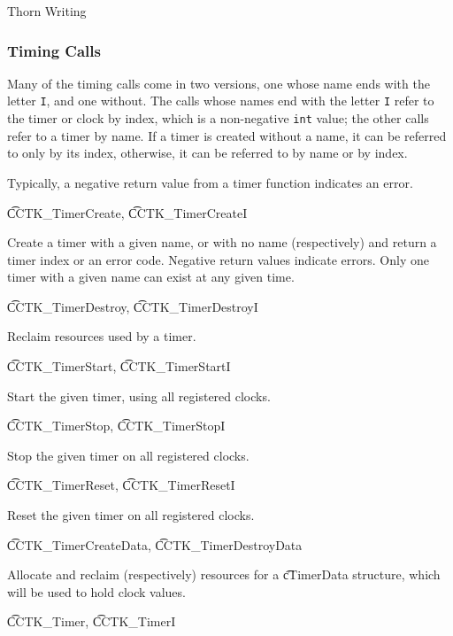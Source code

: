 \begin{cactuspart}{Thorn Writing}
\subsubsection{Timing Calls}

Many of the timing calls come in two versions, one whose name ends with 
the letter \texttt{I}, and one without.  The calls whose names end with the 
letter \texttt{I} refer to the timer or clock by index, which is a
non-negative \texttt{int} value; the other calls refer to a timer by name. 
If a timer is created without a name, it can be referred to only by its index,
otherwise, it can be referred to by name or by index.

Typically, a negative return value from a timer function indicates an error.

\begin{Lentry}

\item[{\t CCTK\_TimerCreate}, {\t CCTK\_TimerCreateI}]

Create a timer with a given name, or with no name (respectively)
and return a timer index or an error code.
Negative return values indicate errors. 
Only one timer with a given name can exist at any given time.

\item[{\t CCTK\_TimerDestroy}, {\t CCTK\_TimerDestroyI}]

Reclaim resources used by a timer.

\item[{\t CCTK\_TimerStart}, {\t CCTK\_TimerStartI}]

Start the given timer, using all registered clocks.

\item[{\t CCTK\_TimerStop}, {\t CCTK\_TimerStopI}]

Stop the given timer on all registered clocks.

\item[{\t CCTK\_TimerReset}, {\t CCTK\_TimerResetI}]

Reset the given timer on all registered clocks.

\item[{\t CCTK\_TimerCreateData}, {\t CCTK\_TimerDestroyData}]

Allocate and reclaim (respectively) resources for a {\t cTimerData} structure,
which will be used to hold clock values.

\item[{\t CCTK\_Timer}, {\t CCTK\_TimerI}]


\end{Lentry}
\end{cactuspart}
